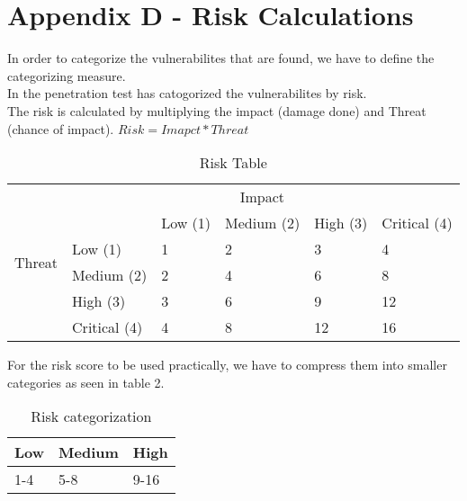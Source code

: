\section{Appendix D - Risk Calculations}

In order to categorize the vulnerabilites that are found, we have to define the categorizing measure. \\
In the penetration test has catogorized the vulnerabilites by risk. \\
The risk is calculated by multiplying the impact (damage done) and Threat (chance of impact). \(Risk = Imapct * Threat\) \\
\begin{table}[h]
\centering
\begin{tabular}{llllll}
\multirow{6}{*}{Threat} & \multicolumn{5}{c}{Impact}                                                                                                                                             \\ \cline{3-6} 
                        & \multicolumn{1}{l|}{}             & \multicolumn{1}{l|}{Low (1)} & \multicolumn{1}{l|}{Medium (2)} & \multicolumn{1}{l|}{High (3)} & \multicolumn{1}{l|}{Critical (4)} \\ \cline{2-6} 
                        & \multicolumn{1}{l|}{Low (1)}      & \multicolumn{1}{l|}{1}       & \multicolumn{1}{l|}{2}          & \multicolumn{1}{l|}{3}        & \multicolumn{1}{l|}{4}            \\ \cline{2-6} 
                        & \multicolumn{1}{l|}{Medium (2)}   & \multicolumn{1}{l|}{2}       & \multicolumn{1}{l|}{4}          & \multicolumn{1}{l|}{6}        & \multicolumn{1}{l|}{8}            \\ \cline{2-6} 
                        & \multicolumn{1}{l|}{High (3)}     & \multicolumn{1}{l|}{3}       & \multicolumn{1}{l|}{6}          & \multicolumn{1}{l|}{9}        & \multicolumn{1}{l|}{12}           \\ \cline{2-6} 
                        & \multicolumn{1}{l|}{Critical (4)} & \multicolumn{1}{l|}{4}       & \multicolumn{1}{l|}{8}          & \multicolumn{1}{l|}{12}       & \multicolumn{1}{l|}{16}           \\ \cline{2-6} 
\end{tabular}
\caption{Risk Table}
\label{my-label}
\end{table}

For the risk score to be used practically, we have to compress them into smaller categories as seen in table 2.

\begin{table}[h]
\centering
\begin{tabular}{|l|l|l|}
\hline
Low & Medium & High \\ \hline
1-4 & 5-8    & 9-16 \\ \hline
\end{tabular}
\caption{Risk categorization}
\label{my-label}
\end{table}
